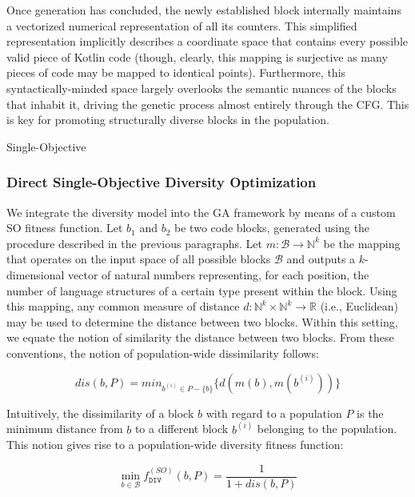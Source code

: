 Once generation has concluded, the newly established block
internally maintains a vectorized numerical representation of
all its counters.
This simplified representation implicitly describes a 
coordinate space that contains every possible valid piece of Kotlin code
(though, clearly, this mapping is surjective as many pieces of code
may be mapped to identical points).
Furthermore, this syntactically-minded space largely overlooks
the semantic nuances of the blocks that inhabit it, driving the genetic process
almost entirely through the \gls{CFG}.
This is key for promoting structurally diverse blocks in the population.

 {Single-Objective}

\subsubsection{\label{subsec:soga}Direct Single-Objective Diversity Optimization}

We integrate the
diversity model into the \gls{GA} framework by means of a custom \gls{SO} fitness function.
Let $b_1$ and $b_2$ be two code blocks, generated using the procedure
described in the previous paragraphs.
Let $m : \mathcal{B} \to \mathbb{N}^{k}$ be the mapping that operates
on the input space of all possible blocks $\mathcal{B}$ and outputs
a $k$-dimensional vector of natural numbers representing, for each position,
the number of language structures of a certain type present within the block.
Using this mapping, any common measure of distance
$d : \mathbb{N}^k \times \mathbb{N}^k \to \mathbb{R}$ (i.e., Euclidean) may be used to determine
the distance between two blocks.
Within this setting, we equate the notion of similarity
the distance between two blocks.
From these conventions, the notion of population-wide 
dissimilarity follows:

\begin{equation}
dis(b, P) = min_{b^{(i)} \in P - \{ b \}} \{ d(m(b), m(b^{(i)})) \}
\label{eq:sim}
\end{equation}


Intuitively, the dissimilarity of a block $b$ with regard to a population
$P$ is the minimum distance from $b$ to a different block $b^{(i)}$
belonging to the population. 
This notion gives rise to a population-wide diversity fitness function:

\begin{equation}
\min_{b \in \mathcal{B}} f^{(SO)}_{\texttt{DIV}}(b, P) = \frac{1}{1 + dis(b, P)}
\end{equation}

